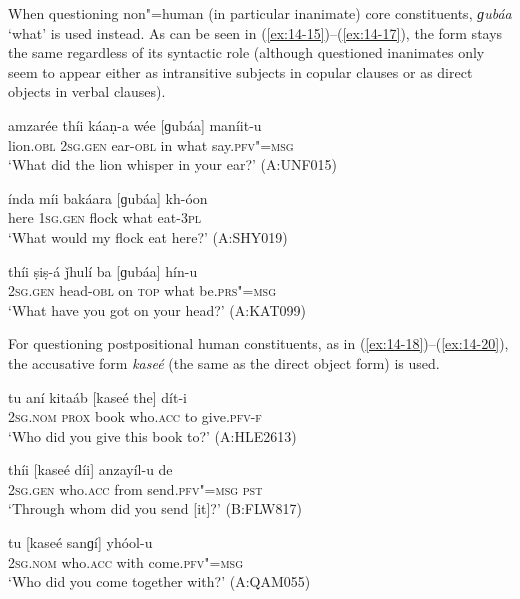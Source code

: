 When questioning non"=human (in particular inanimate) core constituents, \textit{ɡubáa} `what' is used instead. As can be seen in (\ref{ex:14-15})--(\ref{ex:14-17}), the form stays the same regardless of its syntactic role (although questioned inanimates only seem to appear either as intransitive subjects in copular clauses or as direct objects in verbal clauses).

\begin{exe}
\ex
\label{ex:14-15}
\gll amzarée thíi káaṇ-a wée [ɡubáa] maníit-u \\
lion.\textsc{obl} \textsc{2sg.gen} ear-\textsc{obl} in what say.\textsc{pfv"=msg} \\
\glt `What did the lion whisper in your ear?' (A:UNF015)

\ex
\label{ex:14-16}
\gll índa míi bakáara [ɡubáa] kh-óon \\
here \textsc{1sg.gen} flock what eat-\textsc{3pl} \\
\glt `What would my flock eat here?' (A:SHY019)

\ex
\label{ex:14-17}
\gll thíi ṣiṣ-á ǰhulí ba [ɡubáa] hín-u \\
\textsc{2sg.gen} head-\textsc{obl} on \textsc{top} what be.\textsc{prs"=msg} \\
\glt `What have you got on your head?' (A:KAT099)
\end{exe}

 For questioning postpositional human constituents, as in (\ref{ex:14-18})--(\ref{ex:14-20}), the accusative form \textit{kaseé} (the same as the direct object form) is used.

\begin{exe}
\ex
\label{ex:14-18}
\gll tu aní kitaáb [kaseé the] dít-i \\
\textsc{2sg.nom} \textsc{prox} book who.\textsc{acc} to give.\textsc{pfv-f} \\
\glt `Who did you give this book to?' (A:HLE2613)

\ex
\label{ex:14-19}
\gll thíi [kaseé díi] anzayíl-u de \\
\textsc{2sg.gen} who.\textsc{acc} from send.\textsc{pfv"=msg} \textsc{pst} \\
\glt `Through whom did you send [it]?' (B:FLW817)

\ex
\label{ex:14-20}
\gll tu [kaseé sanɡí] yhóol-u \\
\textsc{2sg.nom} who.\textsc{acc} with come.\textsc{pfv"=msg} \\
\glt `Who did you come together with?' (A:QAM055)
\end{exe}

